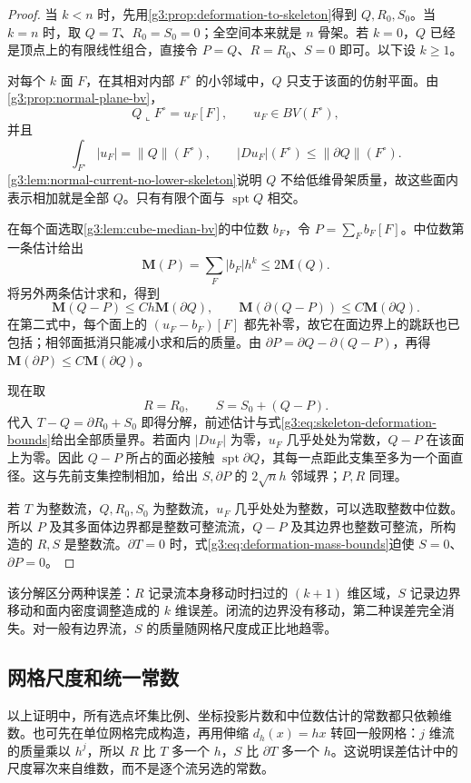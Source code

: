 \begin{proof}
	当 \(k<n\) 时，先用\cref{g3:prop:deformation-to-skeleton}得到 \(Q,R_0,S_0\)。当 \(k=n\) 时，取 \(Q=T\)、\(R_0=S_0=0\)；全空间本来就是 \(n\) 骨架。若 \(k=0\)，\(Q\) 已经是顶点上的有限线性组合，直接令 \(P=Q\)、\(R=R_0\)、\(S=0\) 即可。以下设 \(k\ge1\)。

	对每个 \(k\) 面 \(F\)，在其相对内部 \(F^\circ\) 的小邻域中，\(Q\) 只支于该面的仿射平面。由\cref{g3:prop:normal-plane-bv}，
	\[
	Q\llcorner F^\circ=u_F[F],\qquad u_F\in BV(F^\circ),
	\]
	并且
	\[
	\int_{F^\circ}|u_F|=\|Q\|(F^\circ),\qquad
	|Du_F|(F^\circ)\le\|\partial Q\|(F^\circ).
	\]
	\cref{g3:lem:normal-current-no-lower-skeleton}说明 \(Q\) 不给低维骨架质量，故这些面内表示相加就是全部 \(Q\)。只有有限个面与 \(\operatorname{spt}Q\) 相交。

	在每个面选取\cref{g3:lem:cube-median-bv}的中位数 \(b_F\)，令 \(P=\sum_Fb_F[F]\)。中位数第一条估计给出
	\[
	\mathbf M(P)=\sum_F|b_F|h^k\le2\mathbf M(Q).
	\]
	将另外两条估计求和，得到
	\begin{equation}\label{g3:eq:skeleton-median-error}
	\mathbf M(Q-P)\le Ch\mathbf M(\partial Q),\qquad
	\mathbf M(\partial(Q-P))\le C\mathbf M(\partial Q).
	\end{equation}
	在第二式中，每个面上的 \((u_F-b_F)[F]\) 都先补零，故它在面边界上的跳跃也已包括；相邻面抵消只能减小求和后的质量。由 \(\partial P=\partial Q-\partial(Q-P)\)，再得 \(\mathbf M(\partial P)\le C\mathbf M(\partial Q)\)。

	现在取
	\[
	R=R_0,\qquad S=S_0+(Q-P).
	\]
	代入 \(T-Q=\partial R_0+S_0\) 即得分解，前述估计与式\eqref{g3:eq:skeleton-deformation-bounds}给出全部质量界。若面内 \(|Du_F|\) 为零，\(u_F\) 几乎处处为常数，\(Q-P\) 在该面上为零。因此 \(Q-P\) 所占的面必接触 \(\operatorname{spt}\partial Q\)，其每一点距此支集至多为一个面直径。这与先前支集控制相加，给出 \(S,\partial P\) 的 \(2\sqrt n h\) 邻域界；\(P,R\) 同理。

	若 \(T\) 为整数流，\(Q,R_0,S_0\) 为整数流，\(u_F\) 几乎处处为整数，可以选取整数中位数。所以 \(P\) 及其多面体边界都是整数可整流流，\(Q-P\) 及其边界也整数可整流，所构造的 \(R,S\) 是整数流。\(\partial T=0\) 时，式\eqref{g3:eq:deformation-mass-bounds}迫使 \(S=0\)、\(\partial P=0\)。
\end{proof}

该分解区分两种误差：\(R\) 记录流本身移动时扫过的 \((k+1)\) 维区域，\(S\) 记录边界移动和面内密度调整造成的 \(k\) 维误差。闭流的边界没有移动，第二种误差完全消失。对一般有边界流，\(S\) 的质量随网格尺度成正比地趋零。

\subsection{网格尺度和统一常数}
\label{g3:subsec:2204:04}
以上证明中，所有选点坏集比例、坐标投影片数和中位数估计的常数都只依赖维数。也可先在单位网格完成构造，再用伸缩 \(d_h(x)=hx\) 转回一般网格：\(j\) 维流的质量乘以 \(h^j\)，所以 \(R\) 比 \(T\) 多一个 \(h\)，\(S\) 比 \(\partial T\) 多一个 \(h\)。这说明误差估计中的尺度幂次来自维数，而不是逐个流另选的常数。

